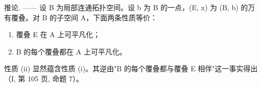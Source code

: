 推论. —— 设 B 为局部连通拓扑空间。设 b 为 B 的一点，(E, x) 为 (B, b) 的万有覆叠。对 B 的子空间 A，下面两条性质等价：

\begin{enumerate}
\def\labelenumi{(\roman{enumi})}
\item
  覆叠 E 在 A 上可平凡化；
\item
  B 的每个覆叠都在 A 上可平凡化。
\end{enumerate}

性质 (ii) 显然蕴含性质 (i)。其逆由"B 的每个覆叠都与覆叠 E 相伴"这一事实得出（I, 第 105 页, 命题 7）。

